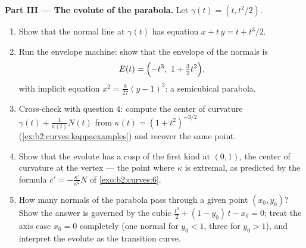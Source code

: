 \begin{problem}
\medskip
\noindent\textbf{Part III --- The evolute of the parabola.}
Let $\gamma(t) = (t, t^2/2)$.
\begin{enumerate}[resume]
  \item Show that the normal line at $\gamma(t)$ has equation
        $x + t\,y = t + t^3/2$.
  \item Run the envelope machine: show that the envelope of
        the normals is
        \[
        E(t) = \Bigl(-t^3,\ 1 + \tfrac32 t^2\Bigr),
        \]
        with implicit equation $x^2 = \tfrac8{27}(y - 1)^3$:
        a semicubical parabola.
  \item Cross-check with question 4: compute the center of
        curvature $\gamma(t) + \frac1{\kappa(t)}N(t)$ from
        $\kappa(t) = (1 + t^2)^{-3/2}$
        (\cref{ex:b2:curves:kappaexamples}) and recover the
        same point.
  \item Show that the evolute has a cusp of the first kind at
        $(0, 1)$, the center of curvature at the vertex ---
        the point where $\kappa$ is extremal, as predicted by
        the formula $c' = -\frac{\kappa'}{\kappa^2}N$ of
        \cref{exo:b2:curves:6}.
  \item How many normals of the parabola pass through a given
        point $(x_0, y_0)$? Show the answer is governed by
        the cubic $\tfrac{t^3}2 + (1 - y_0)\,t - x_0 = 0$;
        treat the axis case $x_0 = 0$ completely (one normal
        for $y_0 < 1$, three for $y_0 > 1$), and interpret
        the evolute as the transition curve.
\end{enumerate}


\end{problem}
